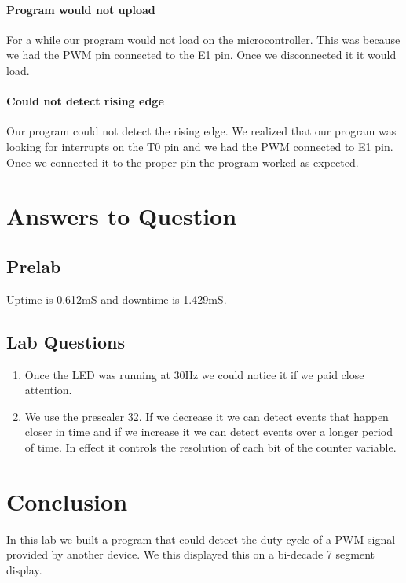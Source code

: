 \documentclass{article}
\begin{document}
	\paragraph*{Program would not upload} For a while our program would not load on the microcontroller. This was because we had the PWM pin connected to the E1 pin. Once we disconnected it it would load.
	\paragraph*{Could not detect rising edge} Our program could not detect the rising edge. We realized that our program was looking for interrupts on the T0 pin and we had the PWM connected to E1 pin. Once we connected it to the proper pin the program worked as expected.
	\section*{Answers to Question}
	\subsection*{Prelab}
	Uptime is 0.612mS and downtime is 1.429mS.
	\subsection*{Lab Questions}
	\begin{enumerate}
		\item Once the LED was running at 30Hz we could notice it if we paid close attention.
		\item We use the prescaler 32. If we decrease it we can detect events that happen closer in time and if we increase it we can detect events over a longer period of time. In effect it controls the resolution of each bit of the counter variable.
	\end{enumerate}
	\section*{Conclusion}
	In this lab we built a program that could detect the duty cycle of a PWM signal provided by another device. We this displayed this on a bi-decade 7 segment display.
	
\end{document}
